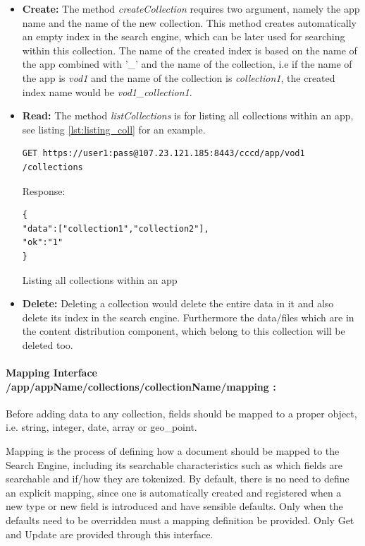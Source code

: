 \begin{itemize}
\item \textbf{Create:} The method \textit{createCollection} requires two argument, namely the app name and the name of the new collection. This method creates automatically an empty index in the search engine, which can be later used for searching within this collection. The name of the created index is based on the name of the app combined with '\_' and the name of the collection, i.e if the name of the app is \textit{vod1} and the name of the collection is \textit{collection1}, the created index name would be \textit{vod1\_collection1}.

\item \textbf{Read:} The method \textit{listCollections} is for listing all collections within an app, see listing \ref{lst:listing_coll} for an example.

\begin{code}
\begin{verbatim}
GET https://user1:pass@107.23.121.185:8443/cccd/app/vod1
/collections
\end{verbatim}
Response:
\begin{verbatim}
{
"data":["collection1","collection2"],
"ok":"1"
}
\end{verbatim}
\caption{Listing all collections within an app}
\label{lst:listing_coll}
\end{code}

\item \textbf{Delete:} Deleting a collection would delete the entire data in it and also delete its index in the search engine. Furthermore the data/files which are in the content distribution component, which belong to this collection will be deleted too.
\end{itemize}

\paragraph{Mapping Interface /app/{appName}/collections/{collectionName}/mapping :\label{sec:des_rest_api_mapping}} Before adding data to any collection, fields should be mapped to a proper object, i.e. string, integer, date, array or geo\_point. 

Mapping is the process of defining how a document should be mapped to the Search Engine, including its searchable characteristics such as which fields are searchable and if/how they are tokenized.  By default, there is no need to define an explicit mapping, since one is automatically created and registered when a new type or new field is introduced and have sensible defaults. Only when the defaults need to be overridden must a mapping definition be provided. Only Get and Update are provided through this interface.
 
